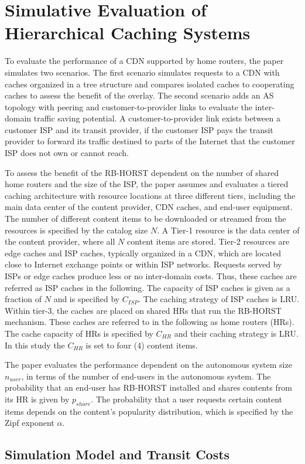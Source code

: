 \section{Simulative Evaluation of Hierarchical Caching Systems}\label{sec:eval}

To evaluate the performance of a CDN supported by home routers, the paper simulates two scenarios. The first scenario simulates requests to a CDN with caches organized in a tree structure and compares isolated caches to cooperating caches to assess the benefit of the overlay.
The second scenario adds an AS topology with peering and customer-to-provider links to evaluate the inter-domain traffic saving potential. A customer-to-provider link exists between a customer ISP and its transit provider, if the customer ISP pays the transit provider to forward its traffic destined to parts of the Internet that the customer ISP does not own or cannot reach.


To assess the benefit of the RB-HORST dependent on the number of shared home routers and the size of the ISP, the paper assumes and evaluates a tiered caching architecture with resource locations at three different tiers, including the main data center of the content provider, CDN caches, and end-user equipment.
The number of different content items to be downloaded or streamed from the resources is specified by the catalog size $N$. A Tier-1 resource is the data center of the content provider, where all $N$ content items are stored. Tier-2 resources are edge caches and ISP caches, typically organized in a CDN, which are located close to Internet exchange points or within ISP networks. Requests served by ISPs or edge caches produce less or no inter-domain costs. Thus, these caches are referred as ISP caches in the following. The capacity of ISP caches is given as a fraction of $N$ and is specified by $C_{ISP}$. The caching strategy of ISP caches is LRU.
Within tier-3, the caches are placed on shared HRs that run the RB-HORST mechanism. These caches are referred to in the following as home routers (HRs). The cache capacity of HRs is specified by $C_{HR}$ and their caching strategy is LRU. In this study the $C_{HR}$ is set to four (4) content items.

The paper evaluates the performance dependent on the autonomous system size $n_{user}$, in terms of the number of end-users in the autonomous system. The probability that an end-user has RB-HORST installed and shares contents from its HR is given by $p_{share}$. The probability that a user requests certain content items depends on the content's popularity distribution, which is specified by the Zipf exponent $\alpha$.

\subsection{Simulation Model and Transit Costs}\label{sec:simeval}
